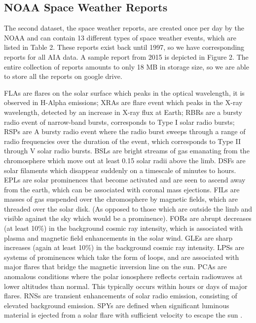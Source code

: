 \documentclass[12pt, letterpaper]{article}
\begin{document}
\subsection*{NOAA Space Weather Reports}

The second dataset, the space weather reports, are created once per day by the NOAA and can contain 13 different types of space weather events, which are listed in Table 2. These reports exist back until 1997, so we have corresponding reports for all AIA data. A sample report from 2015 is depicted in Figure 2. The entire collection of reports amounts to only 18 MB in storage size, so we are able to store all the reports on google drive.

FLAs are flares on the solar surface which peaks in the optical wavelength, it is observed in H-Alpha emissions; XRAs are flare event which peaks in the X-ray wavelength, detected by an increase in X-ray flux at Earth; RBRs are a bursty radio event of narrow-band bursts, corresponds to Type I solar radio bursts; RSPs are A bursty radio event where the radio burst sweeps through a range of radio frequencies over the duration of the event, which corresponds to Type II through V solar radio bursts. BSLs are bright streams of gas emanating from the chromosphere which move out at least 0.15 solar radii above the limb. DSFs are solar filaments which disappear suddenly on a timescale of minutes to hours. EPLs are solar prominences that become activated and are seen to ascend away from the earth, which can be associated with coronal mass ejections. FILs are masses of gas suspended over the chromosphere by magnetic fields, which are threaded over the solar disk. (As opposed to those which are outside the limb and visible against the sky which would be a prominence). FORs are abrupt decreases (at least 10\%) in the background cosmic ray intensity, which is associated with plasma and magnetic field enhancements in the solar wind. GLEs are sharp increases (again at least 10\%) in the background cosmic ray intensity. LPSs are systems of prominences which take the form of loops, and are associated with major flares that bridge the magnetic inversion line on the sun. PCAs are anomalous conditions where the polar ionosphere reflects certain radiowaves at lower altitudes than normal. This typically occurs within hours or days of major flares. RNSs are transient enhancements of solar radio emission, consisting of elevated background emission. SPYs are defined when significant luminous material is ejected from a solar flare with sufficient velocity to escape the sun \cite{SWPC_Glossary}.
\end{document}
